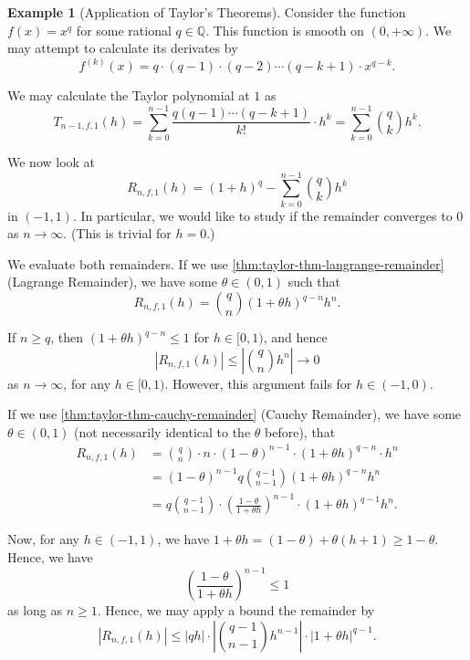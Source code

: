 \documentclass[11pt]{article}
\numberwithin{equation}{section}
\theoremstyle{definition}
\newtheorem{example}[theorem]{Example}
\theoremstyle{remark}
\newcommand{\pqty}[1]{\left(#1\right)}
\newcommand{\abs}[1]{\left|#1\right|}
\newcommand{\oointv}[2]{(#1,#2)}
\newcommand{\cointv}[2]{[#1,#2)}
\newcommand{\QQ}{\mathbb Q}
\newcommand{\plusinfty}{+\infty}
\begin{document}
\begin{example}[Application of Taylor's Theorems]\label{analysis-unit-0132}
    \label{ex:application-taylor}%
    Consider the function \(f\pqty{x} = x^q\) for some rational \(q \in \QQ\). This function is smooth on \(\oointv{0}{\plusinfty}\). We may attempt to calculate its derivates by
    \[
        f^{\pqty{k}} \pqty{x} = q \cdot \pqty{q - 1} \cdot \pqty{q - 2} \cdots \pqty{q - k + 1} \cdot x^{q - k}.
    \]

    We may calculate the Taylor polynomial at \(1\) as
    \[
        T_{n - 1, f, 1} \pqty{h} = \sum_{k = 0}^{n - 1} \frac{q \pqty{q - 1} \cdots \pqty{q - k + 1}}{k!} \cdot h^k = \sum_{k = 0}^{n - 1} \binom{q}{k} h^k.
    \]

    We now look at
    \[
        R_{n, f, 1} \pqty{h} = \pqty{1 + h}^{q} - \sum_{k = 0}^{n - 1} \binom{q}{k} h^k
    \]
    in \(\oointv{-1}{1}\). In particular, we would like to study if the remainder converges to \(0\) as \(n \to \infty\). (This is trivial for \(h = 0\).)

    We evaluate both remainders. If we use \autoref{thm:taylor-thm-langrange-remainder} (Lagrange Remainder), we have some \(\theta \in \oointv{0}{1}\) such that
    \[
        R_{n, f, 1} \pqty{h} = \binom{q}{n} \pqty{1 + \theta h}^{q - n} h^n.
    \]

    If \(n \geq q\), then \(\pqty{1 + \theta h}^{q - n} \leq 1\) for \(h \in \cointv{0}{1}\), and hence
    \[
        \abs{R_{n, f, 1} \pqty{h}} \leq \abs{\binom{q}{n} h^n} \to 0
    \]
    as \(n \to \infty\), for any \(h \in \cointv{0}{1}\). However, this argument fails for \(h \in \oointv{-1}{0}\).

    If we use \autoref{thm:taylor-thm-cauchy-remainder} (Cauchy Remainder), we have some \(\theta \in \oointv{0}{1}\) (not necessarily identical to the \(\theta\) before), that
    \begin{align*}
        R_{n, f, 1} \pqty{h} &= \binom{q}{n} \cdot n \cdot \pqty{1 - \theta}^{n - 1} \cdot \pqty{1 + \theta h}^{q - n} \cdot h^n \\
        &= \pqty{1 - \theta}^{n - 1} q \binom{q - 1}{n - 1} \pqty{1 + \theta h}^{q - n} h^n \\
        &= q \binom{q - 1}{n - 1} \cdot \pqty{\frac{1 - \theta}{1 + \theta h}}^{n - 1} \cdot \pqty{1 + \theta h}^{q - 1} h^n.
    \end{align*}

    Now, for any \(h \in \oointv{-1}{1}\), we have \(1 + \theta h = \pqty{1 - \theta} + \theta \pqty{h + 1} \geq 1 - \theta\). Hence, we have
    \[
        \pqty{\frac{1 - \theta}{1 + \theta h}}^{n - 1} \leq 1
    \]
    as long as \(n \geq 1\). Hence, we may apply a bound the remainder by
    \[
        \abs{R_{n, f, 1} \pqty{h}} \leq \abs{qh} \cdot \abs{\binom{q - 1}{n - 1} h^{n - 1}} \cdot \abs{1 + \theta h}^{q - 1}.
    \]


\end{example}
\end{document}
